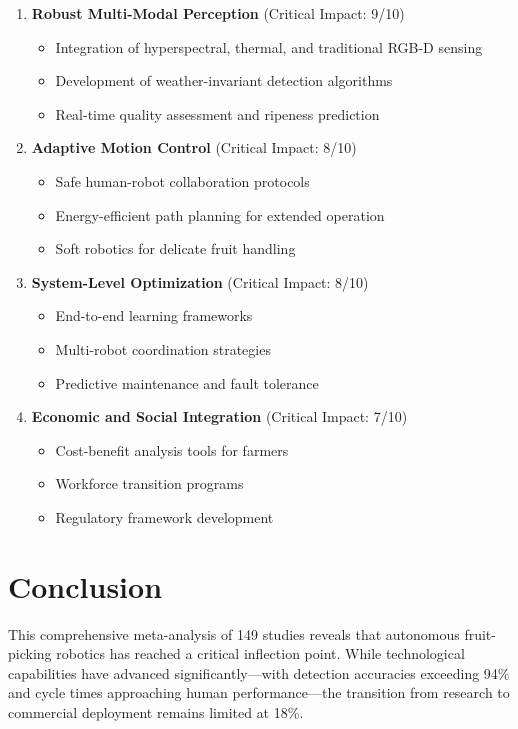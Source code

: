 \documentclass[a4paper,fleqn]{cas-dc}
\begin{document}
\begin{enumerate}
\item \textbf{Robust Multi-Modal Perception} (Critical Impact: 9/10)
   \begin{itemize}
   \item Integration of hyperspectral, thermal, and traditional RGB-D sensing
   \item Development of weather-invariant detection algorithms
   \item Real-time quality assessment and ripeness prediction
   \end{itemize}

\item \textbf{Adaptive Motion Control} (Critical Impact: 8/10)
   \begin{itemize}
   \item Safe human-robot collaboration protocols
   \item Energy-efficient path planning for extended operation
   \item Soft robotics for delicate fruit handling
   \end{itemize}

\item \textbf{System-Level Optimization} (Critical Impact: 8/10)
   \begin{itemize}
   \item End-to-end learning frameworks
   \item Multi-robot coordination strategies
   \item Predictive maintenance and fault tolerance
   \end{itemize}

\item \textbf{Economic and Social Integration} (Critical Impact: 7/10)
   \begin{itemize}
   \item Cost-benefit analysis tools for farmers
   \item Workforce transition programs
   \item Regulatory framework development
   \end{itemize}
\end{enumerate}

\section{Conclusion}

This comprehensive meta-analysis of 149 studies reveals that autonomous fruit-picking robotics has reached a critical inflection point. While technological capabilities have advanced significantly—with detection accuracies exceeding 94\% and cycle times approaching human performance—the transition from research to commercial deployment remains limited at 18\%.
\end{document}
